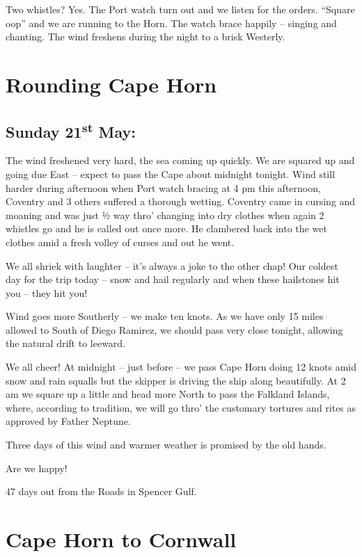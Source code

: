 \documentclass[
  11pt,
  msmallroyalvopaper
]{memoir}
\begin{document}
Two whistles? Yes. The Port watch turn out and we listen for the orders.
``Square oop'' and we are running to the Horn. The watch brace happily
-- singing and chanting. The wind freshens during the night to a brisk
Westerly.

\hypertarget{rounding-cape-horn}{%
\chapter{Rounding Cape Horn}\label{rounding-cape-horn}}

\hypertarget{sunday-21st-may}{%
\section{\texorpdfstring{Sunday 21\textsuperscript{st}
May:}{Sunday 21st May:}}\label{sunday-21st-may}}

The wind freshened very hard, the sea coming up quickly. We are squared
up and going due East -- expect to pass the Cape about midnight tonight.
Wind still harder during afternoon when Port watch bracing at 4 pm this
afternoon, Coventry and 3 others suffered a thorough wetting. Coventry
came in cursing and moaning and was just ½ way thro' changing into dry
clothes when again 2 whistles go and he is called out once more. He
clambered back into the wet clothes amid a fresh volley of curses and
out he went.

We all shriek with laughter -- it's always a joke to the other chap! Our
coldest day for the trip today -- snow and hail regularly and when these
hailstones hit you -- they hit you!

Wind goes more Southerly -- we make ten knots. As we have only 15 miles
allowed to South of Diego Ramirez, we should pass very close tonight,
allowing the natural drift to leeward.

We all cheer! At midnight -- just before -- we pass Cape Horn doing 12
knots amid snow and rain squalls but the skipper is driving the ship
along beautifully. At 2 am we square up a little and head more North to
pass the Falkland Islands, where, according to tradition, we will go
thro' the customary tortures and rites as approved by Father Neptune.

Three days of this wind and warmer weather is promised by the old hands.

Are we happy!

47 days out from the Roads in Spencer Gulf.

\hypertarget{cape-horn-to-cornwall}{%
\chapter{Cape Horn to Cornwall}\label{cape-horn-to-cornwall}}
\end{document}
